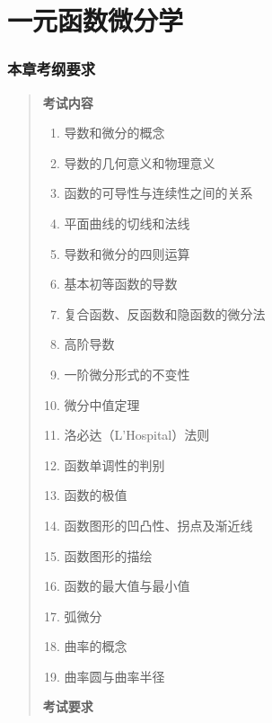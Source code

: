 \documentclass[11pt,openany,UTF8]{ctexbook}
\begin{document}
\chapter{一元函数微分学}
\subsection*{本章考纲要求}

\begin{quote}
\textbf{考试内容}

\begin{enumerate}
\item 导数和微分的概念
\item 导数的几何意义和物理意义
\item 函数的可导性与连续性之间的关系
\item 平面曲线的切线和法线
\item 导数和微分的四则运算
\item 基本初等函数的导数
\item 复合函数、反函数和隐函数的微分法
\item 高阶导数
\item 一阶微分形式的不变性
\item 微分中值定理
\item 洛必达（L'Hospital）法则
\item 函数单调性的判别
\item 函数的极值
\item 函数图形的凹凸性、拐点及渐近线
\item 函数图形的描绘
\item 函数的最大值与最小值
\item 弧微分
\item 曲率的概念
\item 曲率圆与曲率半径
\end{enumerate}
\textbf{考试要求}


\end{quote}
\end{document}
